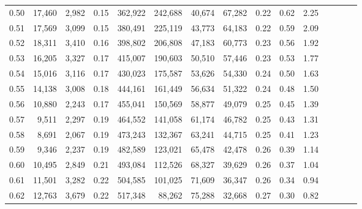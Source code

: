 \begin{tabular}{rrrcrrrrrrrrrrr}
0.50 &  17,460 &  2,982 &                                       0.15 &  362,922 &  242,688 &   40,674 &   67,282 &  0.22 &  0.62 &                         2.25 \\
0.51 &  17,569 &  3,099 &                                       0.15 &  380,491 &  225,119 &   43,773 &   64,183 &  0.22 &  0.59 &                         2.09 \\
0.52 &  18,311 &  3,410 &                                       0.16 &  398,802 &  206,808 &   47,183 &   60,773 &  0.23 &  0.56 &                         1.92 \\
0.53 &  16,205 &  3,327 &                                       0.17 &  415,007 &  190,603 &   50,510 &   57,446 &  0.23 &  0.53 &                         1.77 \\
0.54 &  15,016 &  3,116 &                                       0.17 &  430,023 &  175,587 &   53,626 &   54,330 &  0.24 &  0.50 &                         1.63 \\
0.55 &  14,138 &  3,008 &                                       0.18 &  444,161 &  161,449 &   56,634 &   51,322 &  0.24 &  0.48 &                         1.50 \\
0.56 &  10,880 &  2,243 &                                       0.17 &  455,041 &  150,569 &   58,877 &   49,079 &  0.25 &  0.45 &                         1.39 \\
0.57 &   9,511 &  2,297 &                                       0.19 &  464,552 &  141,058 &   61,174 &   46,782 &  0.25 &  0.43 &                         1.31 \\
0.58 &   8,691 &  2,067 &                                       0.19 &  473,243 &  132,367 &   63,241 &   44,715 &  0.25 &  0.41 &                         1.23 \\
0.59 &   9,346 &  2,237 &                                       0.19 &  482,589 &  123,021 &   65,478 &   42,478 &  0.26 &  0.39 &                         1.14 \\
0.60 &  10,495 &  2,849 &                                       0.21 &  493,084 &  112,526 &   68,327 &   39,629 &  0.26 &  0.37 &                         1.04 \\
0.61 &  11,501 &  3,282 &                                       0.22 &  504,585 &  101,025 &   71,609 &   36,347 &  0.26 &  0.34 &                         0.94 \\
0.62 &  12,763 &  3,679 &                                       0.22 &  517,348 &   88,262 &   75,288 &   32,668 &  0.27 &  0.30 &                         0.82 \\

\end{tabular}
